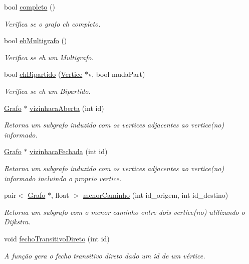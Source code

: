 \begin{DoxyCompactItemize}
bool \hyperlink{class_grafo_a47f39f75d015f8c35bfa71d7a3da1bfa}{completo} ()
\begin{DoxyCompactList}\small\item\em Verifica se o grafo eh completo. \end{DoxyCompactList}\item 
bool \hyperlink{class_grafo_a1fba4f1f969c2dc07171fc294506e2f6}{eh\-Multigrafo} ()
\begin{DoxyCompactList}\small\item\em Verifica se eh um Multigrafo. \end{DoxyCompactList}\item 
bool \hyperlink{class_grafo_ad7d5ff431a1cb3c909b4bbc67e52b459}{eh\-Bipartido} (\hyperlink{class_vertice}{Vertice} $\ast$v, bool muda\-Part)
\begin{DoxyCompactList}\small\item\em Verifica se eh um Bipartido. \end{DoxyCompactList}\item 
\hyperlink{class_grafo}{Grafo} $\ast$ \hyperlink{class_grafo_ab34ab3006a5efe61e3416557a855e326}{vizinhaca\-Aberta} (int id)
\begin{DoxyCompactList}\small\item\em Retorna um subgrafo induzido com os vertices adjacentes ao vertice(no) informado. \end{DoxyCompactList}\item 
\hyperlink{class_grafo}{Grafo} $\ast$ \hyperlink{class_grafo_abe28762d544d99e502c83f00ede75ddf}{vizinhaca\-Fechada} (int id)
\begin{DoxyCompactList}\small\item\em Retorna um subgrafo induzido com os vertices adjacentes ao vertice(no) informado incluindo o proprio vertice. \end{DoxyCompactList}\item 
pair$<$ \hyperlink{class_grafo}{Grafo} $\ast$, float $>$ \hyperlink{class_grafo_a9415f8df731388c329f64e8cd0c5391b}{menor\-Caminho} (int id\-\_\-origem, int id\-\_\-destino)
\begin{DoxyCompactList}\small\item\em Retorna um subgrafo com o menor caminho entre dois vertice(no) utilizando o Dijkstra. \end{DoxyCompactList}\item 
void \hyperlink{class_grafo_aa5db00b08590804c1885d383ce67d1d2}{fecho\-Transitivo\-Direto} (int id)
\begin{DoxyCompactList}\small\item\em A função gera o fecho transitivo direto dado um id de um vértice. \end{DoxyCompactList}\item 

\end{DoxyCompactItemize}
